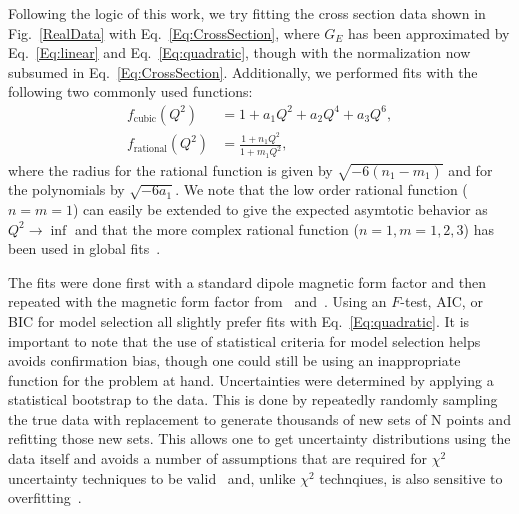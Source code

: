 \documentclass[10pt,aps,prc,twocolumn]{revtex4-1}
\begin{document}
Following the logic of this work, we try fitting the cross section data shown in Fig.~\ref{RealData} with  Eq.~\ref{Eq:CrossSection}, where
$G_E$ has been approximated by Eq.~\ref{Eq:linear} and Eq.~\ref{Eq:quadratic}, though with the normalization now subsumed in Eq.~\ref{Eq:CrossSection}.    
Additionally, we performed fits with the following two commonly used functions:
\begin{align}
f_{\mathrm{cubic}}(Q^2)   & = 1 + a_1 Q^2 + a_2 Q^4 + a_3 Q^6,  \\
f_{\mathrm{rational}}(Q^2) & = \frac{1+n_1 Q^2}{1+m_1 Q^2},
\end{align}
where the radius for the rational function is given by $\sqrt{-6 (n_1 - m_1)}$ and for the polynomials by $\sqrt{-6 a_1}$.
We note that the low order rational function ($n=m=1$) can easily be extended to give the expected asymtotic behavior
as $Q^2 \to \inf$ and that the more complex rational function ($n=1,m=1,2,3$) has been used in global fits~\cite{
Kelly:2004hm,
Puckett:2017flj,   
Gutsche:2017lyu}.

The fits were done first with a standard dipole magnetic form factor
and then repeated with the magnetic form factor from~\cite{Bernauer:2013tpr} and~\cite{Ye:2017gyb}.    
Using an $F$-test, AIC, or BIC for model selection all slightly prefer fits with Eq.~\ref{Eq:quadratic}.
It is important to note that the use of statistical criteria for model selection helps avoids confirmation bias,
though one could still be using an inappropriate function for the problem at hand. 
Uncertainties were determined by applying a statistical bootstrap to the data.   This is done
by repeatedly randomly sampling the true data with replacement to generate thousands of new sets of N points 
and refitting those new sets.   This allows one to get uncertainty distributions using the data itself and
avoids a number of assumptions that are required for $\chi^2$ uncertainty techniques 
to be valid~\cite{Efron:1979} and, unlike $\chi^2$ technqiues, is also sensitive to overfitting~\cite{Andrae:2010}.
\end{document}
